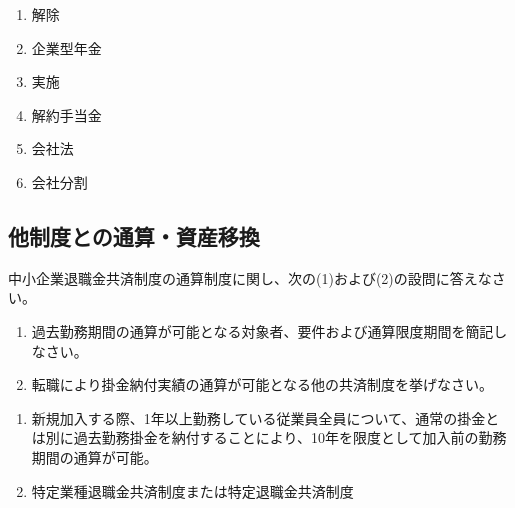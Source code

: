\begin{answerbox}
  \begin{enumerate}[A:]
    \item 解除
    \item 企業型年金
    \item 実施
    \item 解約手当金
    \item 会社法
    \item 会社分割
  \end{enumerate}
\end{answerbox}

\newpage

\subsection{他制度との通算・資産移換}

\begin{shortanswer}[年金1 2020 問題2(5)]
中小企業退職金共済制度の通算制度に関し、次の(1)および(2)の設問に答えなさい。
\begin{enumerate}[(1)]
  \item 過去勤務期間の通算が可能となる対象者、要件および通算限度期間を簡記しなさい。
\item 転職により掛金納付実績の通算が可能となる他の共済制度を挙げなさい。
\end{enumerate}
\end{shortanswer}

\begin{answerbox}
  \begin{enumerate}[(1)]
    \item 新規加入する際、1年以上勤務している従業員全員について、通常の掛金とは別に過去勤務掛金を納付することにより、10年を限度として加入前の勤務期間の通算が可能。
    \item 特定業種退職金共済制度または特定退職金共済制度
  \end{enumerate}
\end{answerbox}

